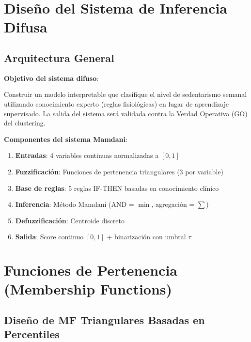 \documentclass[12pt,letterpaper,twoside]{report}
\begin{document}
\section{Diseño del Sistema de Inferencia Difusa}

\subsection{Arquitectura General}

\begin{hipotesisbox}
\textbf{Objetivo del sistema difuso}:

Construir un modelo interpretable que clasifique el nivel de sedentarismo semanal utilizando conocimiento experto (reglas fisiológicas) en lugar de aprendizaje supervisado. La salida del sistema será validada contra la Verdad Operativa (GO) del clustering.
\end{hipotesisbox}

\begin{estadisticobox}
\textbf{Componentes del sistema Mamdani}:

\begin{enumerate}[noitemsep]
    \item \textbf{Entradas}: 4 variables continuas normalizadas a $[0,1]$
    \item \textbf{Fuzzificación}: Funciones de pertenencia triangulares (3 por variable)
    \item \textbf{Base de reglas}: 5 reglas IF-THEN basadas en conocimiento clínico
    \item \textbf{Inferencia}: Método Mamdani (AND = $\min$, agregación = $\sum$)
    \item \textbf{Defuzzificación}: Centroide discreto
    \item \textbf{Salida}: Score continuo $[0,1]$ + binarización con umbral $\tau$
\end{enumerate}
\end{estadisticobox}

\section{Funciones de Pertenencia (Membership Functions)}

\subsection{Diseño de MF Triangulares Basadas en Percentiles}
\end{document}
